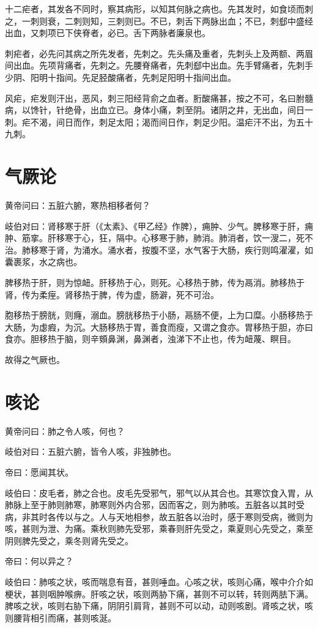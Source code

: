 \documentclass{article}%
\begin{document}
十二疟者，其发各不同时，察其病形，以知其何脉之病也。先其发时，如食顷而刺之，一刺则衰，二刺则知，三刺则已。不已，刺舌下两脉出血；不已，刺郄中盛经出血，又刺项已下侠脊者，必已。舌下两脉者廉泉也。

刺疟者，必先问其病之所先发者，先刺之。先头痛及重者，先刺头上及两额、两眉间出血。先项背痛者，先刺之。先腰脊痛者，先刺郄中出血。先手臂痛者，先刺手少阴、阳明十指间。先足胫酸痛者，先刺足阳明十指间出血。

风疟，疟发则汗出，恶风，刺三阳经背俞之血者。胻酸痛甚，按之不可，名曰胕髓病，以馋针，针绝骨，出血立已。身体小痛，刺至阴。诸阴之井，无出血，间日一刺。疟不渴，间日而作，刺足太阳；渴而间日作，刺足少阳。温疟汗不出，为五十九刺。
\section{气厥论}
黄帝问曰：五脏六腑，寒热相移者何？

岐伯对曰：肾移寒于肝（《太素》、《甲乙经》作脾），痈肿、少气。脾移寒于肝，痈肿、筋挛。肝移寒于心，狂，隔中。心移寒于肺，肺消。肺消者，饮一溲二，死不治。肺移寒于肾，为涌水。涌水者，按腹不坚，水气客于大肠，疾行则鸣濯濯，如囊裹浆，水之病也。

脾移热于肝，则为惊衄。肝移热于心，则死。心移热于肺，传为鬲消。肺移热于肾，传为柔痓。肾移热于脾，传为虚，肠澼，死不可治。

胞移热于膀胱，则癃，溺血。膀胱移热于小肠，鬲肠不便，上为口糜。小肠移热于大肠，为虙瘕，为沉。大肠移热于胃，善食而瘦，又谓之食亦。胃移热于胆，亦曰食亦。胆移热于脑，则辛頞鼻渊，鼻渊者，浊涕下不止也，传为衄蔑、瞑目。

故得之气厥也。
\section{咳论}
黄帝问曰：肺之令人咳，何也？

岐伯对曰：五脏六腑，皆令人咳，非独肺也。

帝曰：愿闻其状。

岐伯曰：皮毛者，肺之合也。皮毛先受邪气，邪气以从其合也。其寒饮食入胃，从肺脉上至于肺则肺寒，肺寒则外内合邪，因而客之，则为肺咳。五脏各以其时受病，非其时各传以与之。人与天地相参，故五脏各以治时，感于寒则受病，微则为咳，甚则为泄、为痛。乘秋则肺先受邪，乘春则肝先受之，乘夏则心先受之，乘至阴则脾先受之，乘冬则肾先受之。

帝曰：何以异之？

岐伯曰：肺咳之状，咳而喘息有音，甚则唾血。心咳之状，咳则心痛，喉中介介如梗状，甚则咽肿喉痹。肝咳之状，咳则两胁下痛，甚则不可以转，转则两胠下满。脾咳之状，咳则右胁下痛，阴阴引肩背，甚则不可以动，动则咳剧。肾咳之状，咳则腰背相引而痛，甚则咳涎。
\end{document}
